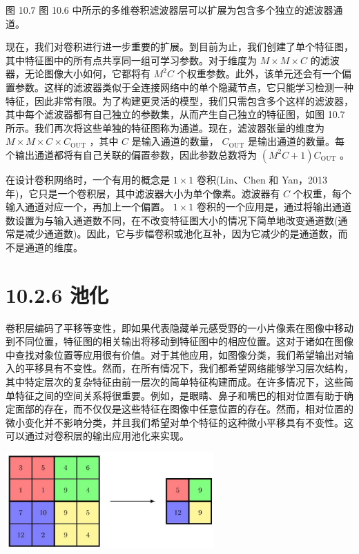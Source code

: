 \documentclass[10pt]{article}
\begin{document}
图 10.7 图 10.6 中所示的多维卷积滤波器层可以扩展为包含多个独立的滤波器通道。

现在，我们对卷积进行进一步重要的扩展。到目前为止，我们创建了单个特征图，其中特征图中的所有点共享同一组可学习参数。对于维度为 \(M \times  M \times  C\) 的滤波器，无论图像大小如何，它都将有 \({M}^{2}C\) 个权重参数。此外，该单元还会有一个偏置参数。这样的滤波器类似于全连接网络中的单个隐藏节点，它只能学习检测一种特征，因此非常有限。为了构建更灵活的模型，我们只需包含多个这样的滤波器，其中每个滤波器都有自己独立的参数集，从而产生自己独立的特征图，如图 10.7 所示。我们再次将这些单独的特征图称为通道。现在，滤波器张量的维度为 \(M \times  M \times  C \times  {C}_{\mathrm{{OUT}}}\) ，其中 \(C\) 是输入通道的数量， \({C}_{\mathrm{{OUT}}}\) 是输出通道的数量。每个输出通道都将有自己关联的偏置参数，因此参数总数将为 \(\left( {{M}^{2}C + 1}\right) {C}_{\mathrm{{OUT}}}\) 。

在设计卷积网络时，一个有用的概念是 \(1 \times  1\) 卷积(Lin、Chen 和 Yan，2013 年)，它只是一个卷积层，其中滤波器大小为单个像素。滤波器有 \(C\) 个权重，每个输入通道对应一个，再加上一个偏置。 \(1 \times  1\) 卷积的一个应用是，通过将输出通道数设置为与输入通道数不同，在不改变特征图大小的情况下简单地改变通道数(通常是减少通道数)。因此，它与步幅卷积或池化互补，因为它减少的是通道数，而不是通道的维度。

\section*{10.2.6 池化}

卷积层编码了平移等变性，即如果代表隐藏单元感受野的一小片像素在图像中移动到不同位置，特征图的相关输出将移动到特征图中的相应位置。这对于诸如在图像中查找对象位置等应用很有价值。对于其他应用，如图像分类，我们希望输出对输入的平移具有不变性。然而，在所有情况下，我们都希望网络能够学习层次结构，其中特定层次的复杂特征由前一层次的简单特征构建而成。在许多情况下，这些简单特征之间的空间关系将很重要。例如，是眼睛、鼻子和嘴巴的相对位置有助于确定面部的存在，而不仅仅是这些特征在图像中任意位置的存在。然而，相对位置的微小变化并不影响分类，并且我们希望对单个特征的这种微小平移具有不变性。这可以通过对卷积层的输出应用池化来实现。

\begin{center}
\includegraphics[max width=0.6\textwidth]{images/0194e279-9b28-703a-88f4-c3ac21e2010d_316_755_345_798_367_0.jpg}
\end{center}
\hspace*{3em} 
\end{document}
